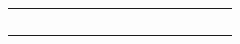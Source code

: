\documentclass{tufte-book}
\begin{document}
\begin{Definition}
\begin{table}[]
\begin{tabular}{cccccccccccccccc}
                        &                                                                                                  &                                 &                                       &                             &                                       &                                 &                                       &                             &                                       &                             &                                       &  &  &  &  \\
                        &                                                                                                  &                                 &                                       &                             &                                       &                                 &                                       &                             &                                       &                             &                                       &  &  &  &  \\
                        &                                                                                                  &                                 &                                       &                             &                                       &                                 &                                       &                             &                                       &                             &                                       &  &  &  &  \\
                        &                                                                                                  &                                 &                                       &                             &                                       &                                 &                                       &                             &                                       &                             & \textbf{}                             &  &  &  &  \\
                        &                                                                                                  &                                 &                                       &                             &                                       &                                 &                                       &                             &                                       &                             &                                       &  &  &  &  \\

\end{tabular}
\end{table}
\end{Definition}
\end{document}
